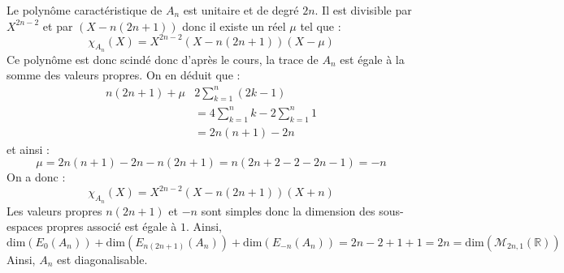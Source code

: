 \documentclass[a4paper,10pt]{report}
\begin{document}
\begin{enumerate}
\noindent Le polynôme caractéristique de $A_n$ est unitaire et de degré $2n$. Il est divisible par $X^{2n-2}$ et par $(X- n(2n+1))$ donc il existe un réel $\mu$ tel que :
$$ \chi_{A_n}(X) = X^{2n-2} (X- n(2n+1)) (X- \mu)$$
Ce polynôme est donc scindé donc d'après le cours, la trace de $A_n$ est égale à la somme des valeurs propres. On en déduit que :
\begin{align*}
 n(2n+1) + \mu &  2 \sum_{k=1}^n (2k-1) \\
 & = 4 \sum_{k=1}^n k - 2 \sum_{k=1}^n 1 \\
 & = 2n(n+1) -2n 
 \end{align*}
 et ainsi :
 $$ \mu = 2n(n+1)-2n-n(2n+1) = n(2n+2-2-2n-1) = -n$$
 On a donc :
 $$  \chi_{A_n}(X) = X^{2n-2} (X- n(2n+1)) (X+n)$$
 Les valeurs propres $n(2n+1)$ et $-n$ sont simples donc la dimension des sous-espaces propres associé est égale à $1$. Ainsi,
 $$ \textrm{dim}(E_0(A_n))+ \textrm{dim}(E_{n(2n+1)}(A_n))+ \textrm{dim}(E_{-n}(A_n)) = 2n-2+1+1=2n = \textrm{dim}(\mathcal{M}_{2n,1}(\mathbb{R}))$$
Ainsi, $A_n$ est diagonalisable.
\end{enumerate}
\end{document}
